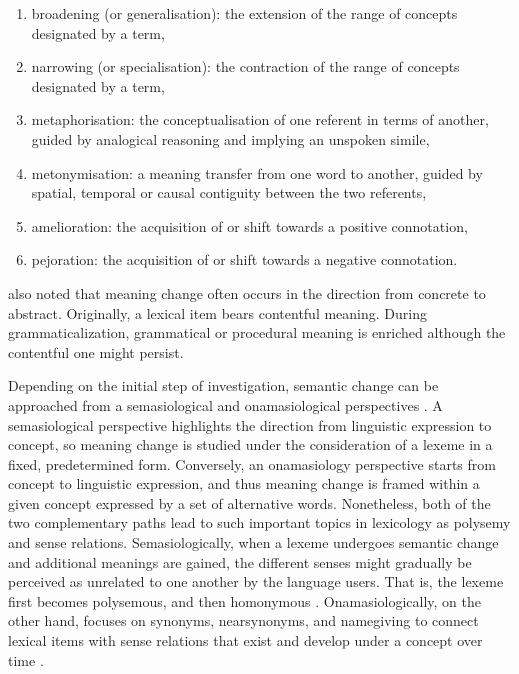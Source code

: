 \begin{enumerate}

\item broadening (or generalisation): the extension of the range of concepts designated by a term, 
\item narrowing (or specialisation): the contraction of the range of concepts designated by a term, 
\item metaphorisation: the conceptualisation of one referent in terms of another, guided by analogical reasoning and implying an unspoken simile, 
\item metonymisation: a meaning transfer from one word to another, guided by spatial, temporal or causal contiguity between the two referents, 
\item amelioration: the acquisition of or shift towards a positive connotation, 
\item pejoration: the acquisition of or shift towards a negative connotation.
\end{enumerate}



  

\textcite[81]{traugott2001regularity} also noted that meaning change often occurs in the direction from concrete to abstract. Originally, a lexical item bears contentful meaning. During grammaticalization, grammatical or procedural meaning is enriched although the contentful one might persist.


Depending on the initial step of investigation, semantic change can be approached from a semasiological and onamasiological perspectives \parencites[17]{geeraerts1997diachronic}[25]{traugott2001regularity}. A semasiological perspective highlights the direction from linguistic expression to concept, so meaning change is studied under the consideration of a lexeme in a fixed, predetermined form. Conversely, an onamasiology perspective starts from concept to linguistic expression, and thus meaning change is framed within a given concept expressed by a set of alternative words. Nonetheless, both of the two complementary paths lead to such important topics in lexicology as polysemy and sense relations. Semasiologically, when a lexeme undergoes semantic change and additional meanings are gained, the different senses might gradually be perceived as unrelated to one another by the language users. That is, the lexeme first becomes polysemous, and then homonymous \parencite[25]{traugott2001regularity}. Onamasiologically, on the other hand, focuses on synonyms, near­synonyms, and name­giving to connect lexical items with sense relations that exist and develop under a concept over time \parencite[17]{geeraerts1997diachronic}.

